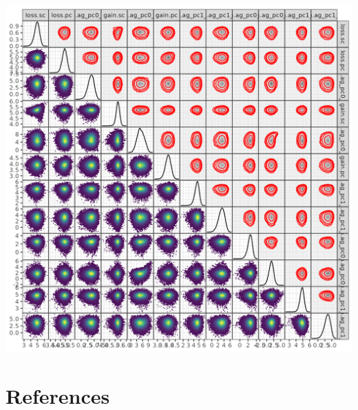 \documentclass[
]{article}
\begin{document}
\includegraphics[width=10.5in]{pix/mcmc_pairs_tb_nogainloss}

\hypertarget{references}{%
\section*{References}\label{references}}
\end{document}
